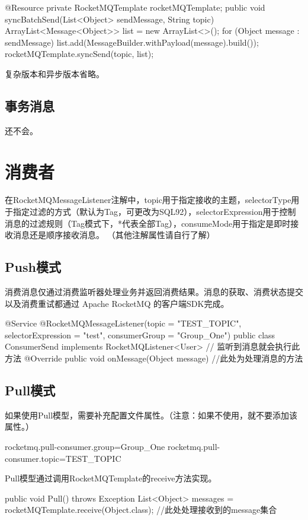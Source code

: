 \documentclass[11pt, a4paper, oneside, fontset=none]{ctexbook}
\begin{document}
\begin{java}[caption=批量消息同步发送方式（简化版）]
@Resource
private RocketMQTemplate rocketMQTemplate;
public void syncBatchSend(List<Object> sendMessage, String topic) {
  ArrayList<Message<Object>> list = new ArrayList<>();
  for (Object message : sendMessage) {
    list.add(MessageBuilder.withPayload(message).build());
  }
  rocketMQTemplate.syncSend(topic, list);
}
\end{java}

复杂版本和异步版本省略。
\subsection{事务消息}
还不会。

\section{消费者}
在RocketMQMessageListener注解中，topic用于指定接收的主题，selectorType用于指定过滤的方式（默认为Tag，可更改为SQL92），selectorExpression用于控制消息的过滤规则（Tag模式下，*代表全部Tag），consumeMode用于指定是即时接收消息还是顺序接收消息。
（其他注解属性请自行了解）
\subsection{Push模式}
消费消息仅通过消费监听器处理业务并返回消费结果。消息的获取、消费状态提交以及消费重试都通过 Apache RocketMQ 的客户端SDK完成。
\begin{java}[caption=Push模式消费者]
@Service
@RocketMQMessageListener(topic = "TEST_TOPIC", selectorExpression = "test", consumerGroup = "Group_One")
public class ConsumerSend implements RocketMQListener<User> {
  // 监听到消息就会执行此方法
  @Override
  public void onMessage(Object message) {
    //此处为处理消息的方法
  }
}
\end{java}

\subsection{Pull模式}
如果使用Pull模型，需要补充配置文件属性。（注意：如果不使用，就不要添加该属性。）

\begin{yaml}[caption=lite pull consumer所需配置属性]
rocketmq.pull-consumer.group=Group_One
rocketmq.pull-consumer.topic=TEST_TOPIC
\end{yaml}

Pull模型通过调用RocketMQTemplate的receive方法实现。
\begin{java}[caption=Pull模式消费者]
public void Pull() throws Exception {
  List<Object> messages = rocketMQTemplate.receive(Object.class);
  //此处处理接收到的message集合
}
\end{java}
\end{document}
